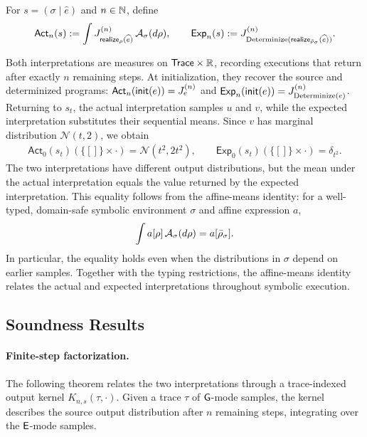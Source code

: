 \begin{definition}
For $s=(\sigma\mid\widehat e)$ and $n\in\Nat$, define
\[
\begin{aligned}
  \mathsf{Act}_n(s)
  :=
  \int
    \joint{\mathsf{realize}_\rho(\widehat e)}n\,
    \mathcal A_\sigma(d\rho), \qquad
  \mathsf{Exp}_n(s)
  :=
  \joint{
    \trans{\mathsf{realize}_{\bar\rho_\sigma}(\widehat e)}
  }n.
\end{aligned}
\]
\end{definition}

Both interpretations are measures on
$\Trace\times\Real$, recording executions that
return after exactly $n$ remaining steps.
At initialization, they recover the source and determinized programs: $
  \mathsf{Act}_n(\mathsf{init}(e)) = \joint{e}n$ and 
  $\mathsf{Exp}_n(\mathsf{init}(e)) = \joint{\trans e}n$. Returning to $s_t$, the actual interpretation
samples $u$ and $v$, while the expected
interpretation substitutes their sequential means.
Since $v$ has marginal distribution
$\mathcal N(t,2)$, we obtain
\[
\begin{aligned}
  \mathsf{Act}_0(s_t)(\{[]\}\times\cdot)
    =\mathcal N(t^2,2t^2), \qquad \mathsf{Exp}_0(s_t)(\{[]\}\times\cdot)
    =\delta_{t^2}.
\end{aligned}
\]
The two interpretations have different output distributions, but the mean
under the actual interpretation equals the value returned by the expected
interpretation. This equality follows from the affine-means identity:
for a well-typed, domain-safe
symbolic environment $\sigma$ and affine
expression $a$,
\[
  \int a[\rho]\,\mathcal A_\sigma(d\rho)
  =a[\bar\rho_\sigma].\leanref{symbolic-affine-expectation}
\]
In particular, the equality holds even when
the distributions in $\sigma$ depend on
earlier samples. Together with the typing
restrictions, the affine-means identity relates the actual and expected
interpretations throughout symbolic execution.

\subsection{Soundness Results}

\paragraph{Finite-step factorization.}
The following theorem relates the two interpretations through
a trace-indexed output kernel
$K_{n,s}(\tau,\cdot)$.
Given a trace $\tau$ of $\G$-mode
samples, the kernel describes the source
output distribution after $n$ remaining steps,
integrating over the $\E$-mode samples.

